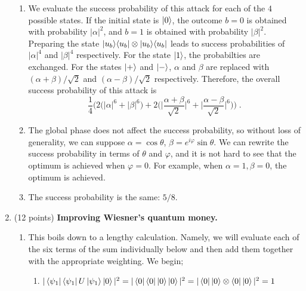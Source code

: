 \documentclass[12pt]{article}
\begin{document}
\begin{enumerate}
\begin{enumerate}
\item We evaluate the success probability of this attack for each of the $4$ possible states. If the initial state is $\ket{0}$, the outcome $b=0$ is obtained with probability $|\alpha|^2$, and $b=1$ is obtained with probability $|\beta|^2$. Preparing the state $\ket{u_b}\!\bra{u_b} \otimes \ket{u_b}\!\bra{u_b}$ leads to success probabilities of $|\alpha|^4$ and $|\beta|^4$ respectively. For the state $\ket{1}$, the probabilties are exchanged. For the states $\ket{+}$ and $\ket{-}$, $\alpha$ and $\beta$ are replaced with $(\alpha + \beta)/\sqrt{2}$ and $(\alpha-\beta)/\sqrt{2}$ respectively. Therefore, the overall success probability of this attack is 
\[ \frac{1}{4}\Big( 2 \big( |\alpha|^6 + |\beta|^6\big) + 2\Big( \Big| \frac{\alpha + \beta}{\sqrt{2}}\Big|^6
+\Big| \frac{\alpha - \beta}{\sqrt{2}}\Big|^6\Big)\Big)\;.\]
\item The global phase does not affect the success probability, so without loss of generality, we can suppose $\alpha = \cos\theta$, $\beta = e^{i\varphi} \sin \theta $. We can rewrite the success probability in terms of $\theta$ and $\varphi$, and it is not hard to see that the optimum is achieved when $\varphi = 0$. For example, when $\alpha= 1, \beta=0$, the optimum is achieved. 
\item The success probability is the same: $5/8$. 
\end{enumerate}



\item (12 points) {\bf Improving Wiesner's quantum money.}

\begin{enumerate}
\item 
This boils down to a lengthy calculation. Namely, we will evaluate each of the six terms of the sum individually below and then add them together with the appropriate weighting. We begin;
\begin{enumerate}
    \item $|\bra{\psi_1}\bra{\psi_1}U\ket{\psi_1} \ket{0}|^2 = |\bra{0}\bra{0}\ket{0}\ket{0}|^2 = |\bra{0}\ket{0}\otimes \bra{0}\ket{0}|^2 = 1 $
    

\end{enumerate}
\end{enumerate}
\end{enumerate}
\end{document}
